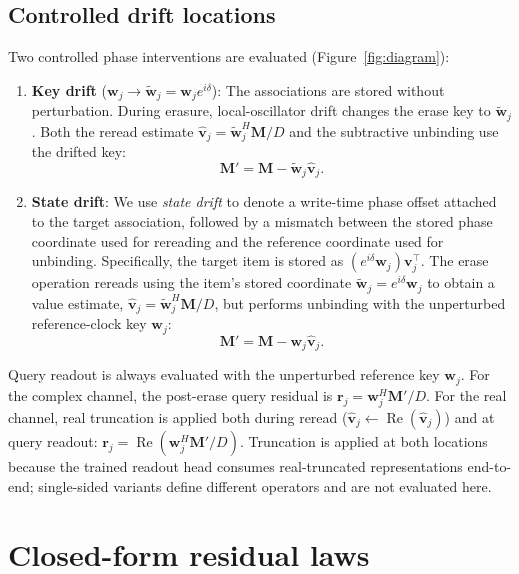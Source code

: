 \documentclass[11pt,a4paper]{article}
\newcommand{\vhat}{\hat{\mathbf{v}}}
\newcommand{\w}{\mathbf{w}}
\newcommand{\vb}{\mathbf{v}}
\newcommand{\M}{\mathbf{M}}
\begin{document}
\subsection{Controlled drift locations}

Two controlled phase interventions are evaluated (Figure~\ref{fig:diagram}):
\begin{enumerate}
  \item \textbf{Key drift} ($\w_j \to \tilde{\w}_j = \w_j e^{i\delta}$): The associations are stored without perturbation. During erasure, local-oscillator drift changes the erase key to $\tilde{\w}_j$. Both the reread estimate $\vhat_j = \tilde{\w}_j^H \M / D$ and the subtractive unbinding use the drifted key:
  \begin{equation}
  \M' = \M - \tilde{\w}_j \vhat_j.
  \end{equation}
  \item \textbf{State drift}: We use \emph{state drift} to denote a write-time phase offset attached to the target association, followed by a mismatch between the stored phase coordinate used for rereading and the reference coordinate used for unbinding. Specifically, the target item is stored as $(e^{i\delta} \w_j) \vb_j^\top$. The erase operation rereads using the item's stored coordinate $\tilde{\w}_j = e^{i\delta}\w_j$ to obtain a value estimate, $\vhat_j = \tilde{\w}_j^H \M / D$, but performs unbinding with the unperturbed reference-clock key $\w_j$:
  \begin{equation}
  \M' = \M - \w_j \vhat_j.
  \end{equation}
\end{enumerate}

Query readout is always evaluated with the unperturbed reference key $\w_j$. For the complex channel, the post-erase query residual is $\mathbf{r}_j = \w_j^H \M' / D$. For the real channel, real truncation is applied both during reread ($\vhat_j \leftarrow \operatorname{Re}(\vhat_j)$) and at query readout: $\mathbf{r}_j = \operatorname{Re}(\w_j^H \M' / D)$. Truncation is applied at both locations because the trained readout head consumes real-truncated representations end-to-end; single-sided variants define different operators and are not evaluated here.

\section{Closed-form residual laws}\label{sec:laws}
\end{document}
